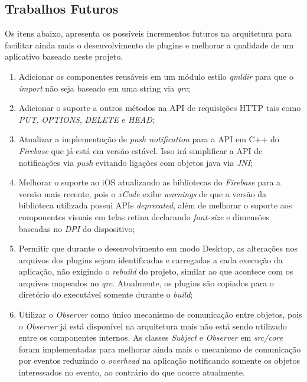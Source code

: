 \subsection{Trabalhos Futuros}
Os itens abaixo, apresenta os possíveis incrementos futuros na arquitetura para facilitar ainda mais o desenvolvimento de plugins e melhorar a qualidade de um aplicativo baseado neste projeto.

\begin{enumerate}
	\item Adicionar os componentes reusáveis em um módulo estilo \textit{qmldir} para que o \textit{import} não seja baseado em uma string via \textit{qrc};

	\item Adicionar o suporte a outros métodos na API de requisições HTTP tais como \textit{PUT}, \textit{OPTIONS}, \textit{DELETE} e \textit{HEAD};

	\item Atualizar a implementação de \textit{push notification} para a API em C++ do \textit{Firebase} que já está em versão estável. Isso irá simplificar a API de notificações via \textit{push} evitando ligações com objetos java via \textit{JNI};

	\item Melhorar o suporte ao iOS atualizando as bibliotecas do \textit{Firebase} para a versão mais recente, pois o \textit{xCode} exibe \textit{warnings} de que a versão da biblioteca utilizada possui APIs \textit{deprecated}, além de melhorar o suporte aos componentes visuais em telas retina declarando \textit{font-size} e dimensões baseadas no \textit{DPI} do dispositivo;

	\item Permitir que durante o desenvolvimento em modo Desktop, as alterações nos arquivos dos plugins sejam identificadas e carregadas a cada execução da aplicação, não exigindo o \textit{rebuild} do projeto, similar ao que acontece com os arquivos mapeados no \textit{qrc}. Atualmente, os plugins são copiados para o diretório do executável somente durante o \textit{build};

	\item Utilizar o \textit{Observer} como único mecanismo de comunicação entre objetos, pois o \textit{Observer} já está disponível na arquitetura mais não está sendo utilizado entre os componentes internos. As classes \textit{Subject} e \textit{Observer} em \textit{src/core} foram implementadas para melhorar ainda mais o mecanismo de comunicação por eventos reduzindo o \textit{overhead} na aplicação notificando somente os objetos interessados no evento, ao contrário do que ocorre atualmente.
\end{enumerate}